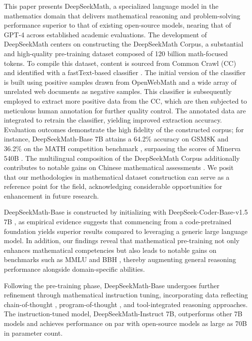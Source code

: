 This paper presents DeepSeekMath, a specialized language model in the mathematics domain that delivers mathematical reasoning and problem-solving performance superior to that of existing open-source models, nearing that of GPT-4 across established academic evaluations. The development of DeepSeekMath centers on constructing the DeepSeekMath Corpus, a substantial and high-quality pre-training dataset composed of 120 billion math-focused tokens. To compile this dataset, content is sourced from Common Crawl (CC) and identified with a fastText-based classifier \citep{joulin2016fasttext}. The initial version of the classifier is built using positive samples drawn from OpenWebMath \citep{openwebmath} and a wide array of unrelated web documents as negative samples. This classifier is subsequently employed to extract more positive data from the CC, which are then subjected to meticulous human annotation for further quality control. The annotated data are integrated to retrain the classifier, yielding improved extraction accuracy. Evaluation outcomes demonstrate the high fidelity of the constructed corpus; for instance, DeepSeekMath-Base 7B attains a 64.2\% accuracy on GSM8K \citep{gsm8k} and 36.2\% on the MATH competition benchmark \citep{MATH}, surpassing the scores of Minerva 540B \citep{minerva}. The multilingual composition of the DeepSeekMath Corpus additionally contributes to notable gains on Chinese mathematical assessments \citep{wei2023cmath,agieval}. We posit that our methodologies in mathematical dataset construction can serve as a reference point for the field, acknowledging considerable opportunities for enhancement in future research.

DeepSeekMath-Base is constructed by initializing with DeepSeek-Coder-Base-v1.5 7B \citep{deepseek-coder}, as empirical evidence suggests that commencing from a code-pretrained foundation yields superior results compared to leveraging a generic large language model. In addition, our findings reveal that mathematical pre-training not only enhances mathematical competencies but also leads to notable gains on benchmarks such as MMLU \citep{mmlu} and BBH \citep{bbh}, thereby augmenting general reasoning performance alongside domain-specific abilities.

Following the pre-training phase, DeepSeekMath-Base undergoes further refinement through mathematical instruction tuning, incorporating data reflecting chain-of-thought \citep{cot}, program-of-thought \citep{pot,pal}, and tool-integrated reasoning \citep{tora} approaches. The instruction-tuned model, DeepSeekMath-Instruct 7B, outperforms other 7B models and achieves performance on par with open-source models as large as 70B in parameter count.

